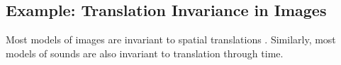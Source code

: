 

%




\subsection{Example: Translation Invariance in Images}

Most models of images are invariant to spatial translations \citep{lecun1995convolutional}.
Similarly, most models of sounds are also invariant to translation through time.

